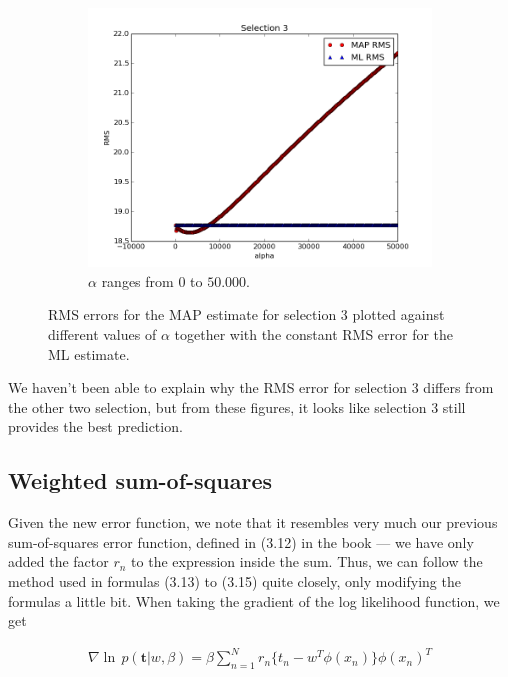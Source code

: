 \documentclass[a4paper]{article}
\begin{document}
\begin{figure}[H]
\begin{adjustwidth}{-7em}{-7em}
    \begin{subfigure}{.32\linewidth}
      \includegraphics[width=\linewidth]{figures/alpha_vs_rms_selection3c.png}
      \caption{$\alpha$ ranges from $0$ to $50.000$.}
      \label{fig:alpha_vs_rms_selection3c}
    \end{subfigure}
  \end{adjustwidth}
  \caption{RMS errors for the MAP estimate for selection 3 plotted against different values of $\alpha$ together with the constant RMS error for the ML estimate.}
  \label{fig:alpha_vs_rms_selection3}
\end{figure}

We haven't been able to explain why the RMS error for selection 3 differs from the other two selection, but from these figures, it looks like selection 3 still provides the best prediction.

\subsection{Weighted sum-of-squares}
Given the new error function, we note that it resembles very much our previous sum-of-squares error function, defined in (3.12) in the book --- we have only added the factor $r_n$ to the expression inside the sum. Thus, we can follow the method used in formulas (3.13) to (3.15) quite closely, only modifying the formulas a little bit. When taking the gradient of the log likelihood function, we get

\begin{align*} %
\nabla \operatorname{ln} \, p(\bm{t} | w, \beta) = \beta \sum_{n=1}^{N} r_n \{ t_n - w^T \phi(x_n) \} \phi(x_n)^T
\end{align*}
\end{document}
